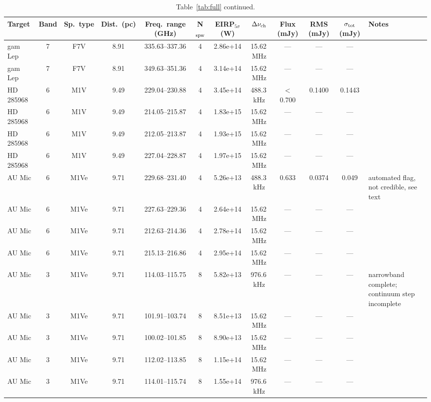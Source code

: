 \documentclass{openjournal}
\begin{document}
\begin{table}
\centering
\scriptsize
\setlength{\tabcolsep}{2pt}
\caption{Table~\ref{tab:full} continued.}
\label{tab:full4}
\begin{tabularx}{\textwidth}{@{}l c c c c c c c c c c X@{}}
\hline
Target & Band & Sp.\ type & Dist.\ (pc) & Freq.\ range (GHz) & N$_{\rm spw}$ & EIRP$_{5\sigma}$ (W) & $\Delta\nu_{\rm ch}$ & Flux (mJy) & RMS (mJy) & $\sigma_{\rm tot}$ (mJy) & Notes \\
\hline
 gam Lep & 7 & F7V & 8.91 & 335.63--337.36 & 4 & 2.86e+14 & 15.62\,MHz & --- & --- & --- &  \\
 gam Lep & 7 & F7V & 8.91 & 349.63--351.36 & 4 & 3.14e+14 & 15.62\,MHz & --- & --- & --- &  \\
 HD 285968 & 6 & M1V & 9.49 & 229.04--230.88 & 4 & 3.45e+14 & 488.3\,kHz & $<$0.700 & 0.1400 & 0.1443 &  \\
 HD 285968 & 6 & M1V & 9.49 & 214.05--215.87 & 4 & 1.83e+15 & 15.62\,MHz & --- & --- & --- &  \\
 HD 285968 & 6 & M1V & 9.49 & 212.05--213.87 & 4 & 1.93e+15 & 15.62\,MHz & --- & --- & --- &  \\
 HD 285968 & 6 & M1V & 9.49 & 227.04--228.87 & 4 & 1.97e+15 & 15.62\,MHz & --- & --- & --- &  \\
 AU Mic & 6 & M1Ve & 9.71 & 229.68--231.40 & 4 & 5.26e+13 & 488.3\,kHz & 0.633 & 0.0374 & 0.049 & automated flag, not credible, see text \\
 AU Mic & 6 & M1Ve & 9.71 & 227.63--229.36 & 4 & 2.64e+14 & 15.62\,MHz & --- & --- & --- &  \\
 AU Mic & 6 & M1Ve & 9.71 & 212.63--214.36 & 4 & 2.78e+14 & 15.62\,MHz & --- & --- & --- &  \\
 AU Mic & 6 & M1Ve & 9.71 & 215.13--216.86 & 4 & 2.95e+14 & 15.62\,MHz & --- & --- & --- &  \\
 AU Mic & 3 & M1Ve & 9.71 & 114.03--115.75 & 8 & 5.82e+13 & 976.6\,kHz & --- & --- & --- & narrowband complete; continuum step incomplete \\
 AU Mic & 3 & M1Ve & 9.71 & 101.91--103.74 & 8 & 8.51e+13 & 15.62\,MHz & --- & --- & --- &  \\
 AU Mic & 3 & M1Ve & 9.71 & 100.02--101.85 & 8 & 8.90e+13 & 15.62\,MHz & --- & --- & --- &  \\
 AU Mic & 3 & M1Ve & 9.71 & 112.02--113.85 & 8 & 1.15e+14 & 15.62\,MHz & --- & --- & --- &  \\
 AU Mic & 3 & M1Ve & 9.71 & 114.01--115.74 & 8 & 1.55e+14 & 976.6\,kHz & --- & --- & --- &  \\

\end{tabularx}
\end{table}
\end{document}
